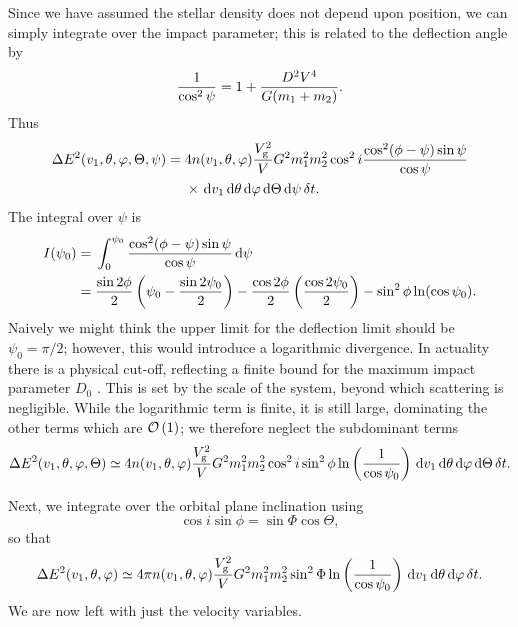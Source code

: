 Since we have assumed the stellar density does not depend upon position, we can simply integrate over the impact parameter; this is related to the deflection angle by
\begin{equation}
\dfrac{1}{\cos^2\psi} = 1 + \dfrac{D^2V^4}{G(m_1 + m_2)}.
\end{equation}
Thus
\begin{align}
\Delta E^2(v_1,\theta,\varphi,\Theta,\psi) =  {} & 4 n(v_1,\theta,\varphi)\dfrac{V_\mathrm{g}^2}{V}G^2m_1^2 m_2^2\cos^2i\dfrac{\cos^2(\phi-\psi)\sin\psi}{\cos\psi} \nonumber \\*
 {} & \times \left. \mathrm{d} v_1\,\mathrm{d}\theta\,\mathrm{d}\varphi\,\mathrm{d}\Theta\,\mathrm{d} \psi\,\delta t. \right.
\end{align}
The integral over $\psi$ is
\begin{align}
I(\psi_0) = {} & \int_{0}^{\psi_0}{\dfrac{\cos^2(\phi-\psi)\sin\psi}{\cos\psi}}\,\mathrm{d}{\psi}\\
 = {} & \dfrac{\sin 2\phi}{2}\left(\psi_0 - \dfrac{\sin 2\psi_0}{2}\right) - \dfrac{\cos 2\phi}{2}\left(\dfrac{\cos 2\psi_0}{2}\right) - \sin^2\phi\ln(\cos\psi_0).
\end{align}
Naively we might think the upper limit for the deflection limit should be $\psi_0 = \pi/2$; however, this would introduce a logarithmic divergence. In actuality there is a physical cut-off, reflecting a finite bound for the maximum impact parameter $D_0$ \citep{Weinberg1986}. This is set by the scale of the system, beyond which scattering is negligible. While the logarithmic term is finite, it is still large, dominating the other terms which are $\mathcal{O}\left({1}\right)$; we therefore neglect the subdominant terms
\begin{equation}
\Delta E^2(v_1,\theta,\varphi,\Theta) \simeq  4 n(v_1,\theta,\varphi)\dfrac{V_\mathrm{g}^2}{V}G^2m_1^2 m_2^2\cos^2i\sin^2\phi\ln\left(\dfrac{1}{\cos\psi_0}\right)\,\mathrm{d} v_1\,\mathrm{d}\theta\,\mathrm{d}\varphi\,\mathrm{d}\Theta\,\delta t.
\end{equation}

Next, we integrate over the orbital plane inclination using
\begin{equation}
\cos i\sin\phi = \sin\Phi\cos\Theta,
\end{equation}
so that
\begin{equation}
\Delta E^2(v_1,\theta,\varphi) \simeq  4\pi n(v_1,\theta,\varphi)\dfrac{V_\mathrm{g}^2}{V}G^2m_1^2 m_2^2\sin^2\Phi\ln\left(\dfrac{1}{\cos\psi_0}\right)\,\mathrm{d} v_1\,\mathrm{d}\theta\,\mathrm{d}\varphi\,\delta t.
\end{equation}
We are now left with just the velocity variables.


